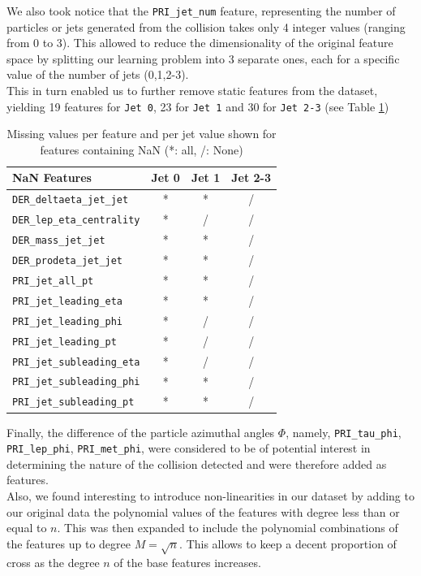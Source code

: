 \documentclass[10pt,conference,compsocconf]{IEEEtran}
\begin{document}
We also took notice that the \verb+PRI_jet_num+ feature, representing the number of particles or jets generated from the collision takes only 4 integer values (ranging from 0 to 3). This allowed to reduce the dimensionality of the original feature space by splitting our learning problem into 3 separate ones, each for a specific value of the number of jets (0,1,2-3).\\
This in turn enabled us to further remove static features from the dataset, yielding 19 features for  \verb+Jet 0+, 23 for \verb+Jet 1+ and 30 for \verb+Jet 2-3+ (see Table \ref{tab_feats})
\begin{table}[h!]
\centering
\caption{Missing values per feature and per jet value shown for features containing NaN (*: all, /: None)}
\footnotesize
\hspace{-0.2cm}
\begin{tabular}{ l| ccc } 
 \hline
   NaN Features & Jet 0 & Jet 1 & Jet 2-3 \\
 \hline
   \verb+DER_deltaeta_jet_jet+  & * & * & /  \\
   \verb+DER_lep_eta_centrality+  & * & / & / \\
   \verb+DER_mass_jet_jet+  & * & * & / \\
   \verb+DER_prodeta_jet_jet+  & * & * & /  \\ 
   \verb+PRI_jet_all_pt+  & * & * & /  \\
   \verb+PRI_jet_leading_eta+  & * & * & / \\
   \verb+PRI_jet_leading_phi+  & * & / & /   \\
   \verb+PRI_jet_leading_pt+  & * & / & / \\
   \verb+PRI_jet_subleading_eta+  & * & / & / \\
   \verb+PRI_jet_subleading_phi+  & * & * & /  \\
   \verb+PRI_jet_subleading_pt+  & * & * & /  \\
  \hline
\end{tabular}
\label{tab_feats}
\end{table}

Finally, the difference of the particle azimuthal angles $\Phi$, namely, \verb+PRI_tau_phi+, \verb+PRI_lep_phi+, \verb+PRI_met_phi+, were considered to be of potential interest  in determining the nature of the collision detected and were therefore added as features. \\
Also, we found interesting to introduce non-linearities in our dataset by adding to our original data the  polynomial values of the features with degree less than or equal to $n$. This was then expanded to include the polynomial combinations of the features up to degree $M=\sqrt{n}$. This allows to keep a decent proportion of cross as the degree $n$ of the base features increases.\vspace{-0.25cm}
\end{document}
